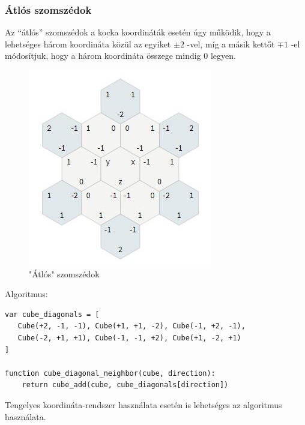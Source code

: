 \subsubsection{Átlós szomszédok}

\noindent Az “átlós” szomszédok a kocka koordináták esetén úgy működik, hogy a lehetséges három koordináta közül az egyiket $ \pm 2$ -vel, míg a másik kettőt $\mp 1$ -el módosítjuk, hogy a három koordináta összege mindig $0$ legyen.

\begin{figure}[h]
\centering
\includegraphics[scale=0.4]{kepek/img81.JPG}
\caption{"Átlós" szomszédok}
\label{fig:img81}
\end{figure}

\noindent Algoritmus:
\begin{verbatim}
var cube_diagonals = [
   Cube(+2, -1, -1), Cube(+1, +1, -2), Cube(-1, +2, -1), 
   Cube(-2, +1, +1), Cube(-1, -1, +2), Cube(+1, -2, +1)
]

function cube_diagonal_neighbor(cube, direction):
    return cube_add(cube, cube_diagonals[direction])
\end{verbatim}

\noindent Tengelyes koordináta-rendszer használata esetén is lehetséges az algoritmus használata.
